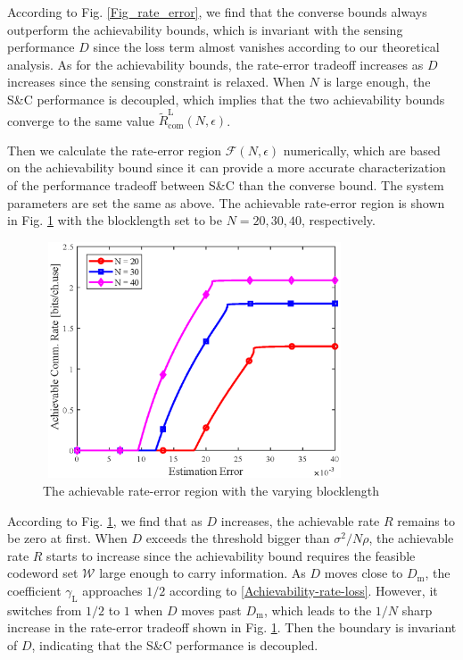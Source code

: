 \documentclass[conference,a4paper]{IEEEtran}
\begin{document}
According to Fig. \ref{Fig_rate_error}, we find that the converse bounds always outperform the achievability bounds, which is invariant with the sensing performance $D$ since the loss term almost vanishes according to our theoretical analysis. As for the achievability bounds, the rate-error tradeoff increases as $D$ increases since the sensing constraint is relaxed. When $N$ is large enough, the S\&C performance is decoupled, which implies that the two achievability bounds converge to the same value $\tilde{R}^\mathrm{L}_\mathrm{com}(N,\epsilon)$.

Then we calculate the rate-error region $\mathcal{F}(N,\epsilon)$ numerically, which are based on the achievability bound since it can provide a more accurate characterization of the performance tradeoff between S\&C than the converse bound. The system parameters are set the same as above. The achievable rate-error region is shown in Fig. \ref{Fig_region} with the blocklength set to be $N = 20,30,40$, respectively.

\begin{figure}[t]
    \centering
    \includegraphics[width = 9cm,height = 7cm]{Fig_region.eps}
    \caption{ The achievable rate-error region with the varying blocklength}
    \label{Fig_region}
\end{figure}


According to Fig. \ref{Fig_region}, we find that as $D$ increases, the achievable rate $R$ remains to be zero at first. When $D$ exceeds the threshold bigger than $\sigma^2/N\rho$, the achievable rate $R$ starts to increase since the achievability bound requires the feasible codeword set $\mathcal{W}$ large enough to carry information. As $D$ moves close to $D_\mathrm{m}$, the coefficient $\gamma_\mathrm{L}$ approaches $1/2$ according to \eqref{Achievability-rate-loss}. However, it switches from $1/2$ to $1$ when $D$ moves past $D_\mathrm{m}$, which leads to the $1/N$ sharp increase in the rate-error tradeoff shown in Fig. \ref{Fig_region}. Then the boundary is invariant of $D$, indicating that the S\&C performance is decoupled.
\end{document}
